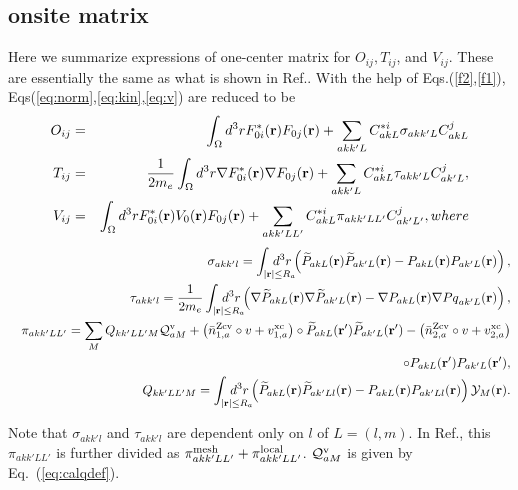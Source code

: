 \documentclass[a4paper,10pt,aip,onecolumn,amsmath,amssymb,floatfix,rmp]{revtex4-1}
\newcommand{\bfr}{{\bf r}}
\newcommand{\YY}{{\cal Y}}
\newcommand{\req}[1]{\mbox{Eq.~\!(\ref{#1})}}
\def\barnzcv{\bar{n}^{\rm Zcv}}
\def\RR{v}
\def\inta{\int_{|\bfr|\leq R_a}\!\!\!\!\!\!\!\!\!\!\!\!}
\begin{document}
\begin{widetext}
\subsection{onsite matrix}
\label{onsitematrix}
Here we summarize expressions of one-center matrix for $O_{ij},T_{ij}$, and
$V_{ij}$. These are essentially the same as what is shown in Ref.\cite{lmfchap}.
With the help of Eqs.(\ref{f2},\ref{f1}), Eqs(\ref{eq:norm},\ref{eq:kin},\ref{eq:v})
are reduced to be
\begin{eqnarray}
O_{ij} &=&\int_\Omega d^3r  F^*_{0i}(\bfr)F_{0j}(\bfr)
  + \sum_{akk'L} C^{*i}_{akL} \sigma_{akk'L} C^{j}_{akL}   \label{eq:normmat1}\\
T_{ij} &=&\frac{1}{2m_e}\int_\Omega d^3r  \nabla F^*_{0i}(\bfr) \nabla F_{0j}(\bfr)
  + \sum_{akk'L} C^{*i}_{akL} \tau_{akk'L} C^{j}_{ak'L},   \label{eq:kinmmat1}\\
V_{ij}&=&\int_\Omega d^3r  F^*_{0i}(\bfr)V_0(\bfr)F_{0j}(\bfr)
  + \sum_{akk'LL'} C^{*i}_{akL} \pi_{akk'LL'} C^{j}_{ak'L'} \label{eq:vpot},
where
\end{eqnarray}
\begin{eqnarray}
&&\sigma_{akk'l}= \inta d^3r  
 \left(\widetilde{P}_{akL}(\bfr) \widetilde{P}_{ak'L}(\bfr)
- {P}_{akL}(\bfr) {P}_{ak'L}(\bfr)\right), \label{matsig} \\
&&\tau_{akk'l}= \frac{1}{2m_e}\inta d^3r  
 \left(\nabla \widetilde{P}_{akL}(\bfr) \nabla \widetilde{P}_{ak'L}(\bfr)
-\nabla {P}_{akL}(\bfr) \nabla {Pq}_{ak'L}(\bfr)\right), \label{mattau}\\
&&\pi_{akk'LL'}= \sum_M Q_{kk'LL'M} {\cal Q}^{\rm v}_{aM} +
  \left(\barnzcv_{1,a} \circ \RR + v^{\rm xc}_{1,a} \right)\circ
  \widetilde{P}_{akL}(\bfr') \widetilde{P}_{ak'L}(\bfr')
- \left(\barnzcv_{2,a} \circ \RR + v^{\rm xc}_{2,a} \right) \nonumber \\
&&\circ
  {P}_{akL}(\bfr') {P}_{ak'L}(\bfr'), \label{matpi}\\
&&Q_{kk'LL'M}=\inta d^3r
\left( \widetilde{P}_{akL}(\bfr) \widetilde{P}_{ak'Ll}(\bfr)
- {P}_{akL}(\bfr) {P}_{ak'Ll}(\bfr)\right) \YY_M(\bfr) \label{qmom}. 
\end{eqnarray}
\end{widetext}
Note that $\sigma_{akk'l}$ and $\tau_{akk'l}$ are dependent only on
$l$ of $L=(l,m)$.
In Ref.\cite{lmfchap}, this $\pi_{akk'LL'}$ is further divided as
$\pi^{\rm mesh}_{akk'LL'} + \pi^{\rm local}_{akk'LL'}$.
${\cal Q}^{\rm v}_{aM}$ is given by \req{eq:calqdef}.

\end{document}
